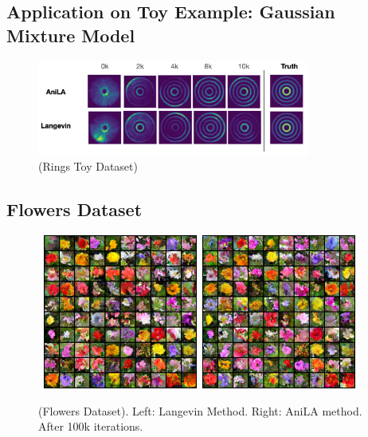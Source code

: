 \documentclass{article}
\begin{document}
\subsection{Application on Toy Example: Gaussian Mixture Model}

\begin{figure}[H]
\begin{center}
\includegraphics[width=0.8\textwidth]{figs/rings}
\caption{(Rings Toy Dataset) }
\label{fig:results}
\end{center}
\end{figure}


\subsection{Flowers Dataset}

\begin{figure}[h]
    \begin{center}
        \mbox{
        \includegraphics[width=2in]{figs/flowerslangevin}
        \includegraphics[width=2in]{figs/flowersanila}
        }
    \end{center}
    \vspace{-0.1in}
	\caption{(Flowers Dataset). Left: Langevin Method. Right: AniLA method. After 100k iterations.}
	\label{fig:flowers}
\end{figure}
\end{document}
